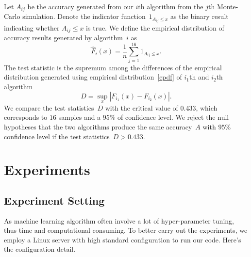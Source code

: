 \documentclass[12pt]{article} %
\begin{document}
Let $A_{ij}$ be the accuracy generated from our {$i$}th algorithm from the $j$th Monte-Carlo simulation. Denote the indicator function~$1_{A_{ij} \leq x}$ as the binary result indicating whether $A_{ij} \leq x$ is true. We define the empirical distribution of accuracy results generated by algorithm~$i$ as
\begin{equation}\label{epdf}
  \hat{F}_{i}(x)=\frac{1}{n}\sum_{j=1}^{16}1_{A_{ij} \leq x}.
\end{equation}
The test statistic is the supremum among the differences of the empirical distribution generated using empirical distribution~\eqref{epdf} of $i_1$th and $i_2$th algorithm \citep{Walck:1996cca}
\begin{equation}\label{teststatistic}
D=\sup _{x}\left|F_{i_1}(x)-F_{i_2}(x)\right|.
\end{equation}
We compare the test statistics~$D$ with the critical value of $0.433$, which corresponds to $16$ samples and a $95\%$ of confidence level. We reject the null hypotheses that the two algorithms produce the same accuracy~$A$ with $95\%$ confidence level if the test statistics~$D>0.433$. 
\section{Experiments}\label{result}

\subsection{Experiment Setting}
As machine learning algorithm often involve a lot of hyper-parameter tuning, thus time and computational consuming. To better carry out the experiments, we employ a Linux server with high standard configuration to run our code. Here's the configuration detail.
\end{document}
